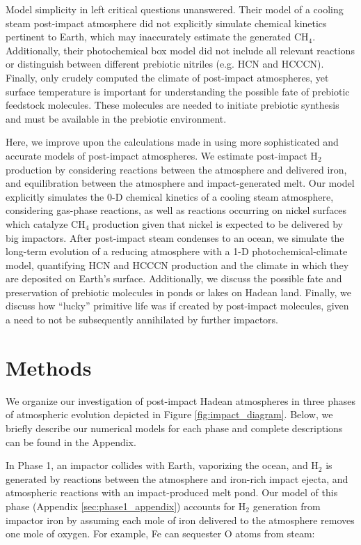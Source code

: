 Model simplicity in \citet{Zahnle_2020} left critical questions unanswered. Their model of a cooling steam post-impact atmosphere did not explicitly simulate chemical kinetics pertinent to Earth, which may inaccurately estimate the generated CH$_4$. Additionally, their photochemical box model did not include all relevant reactions or distinguish between different prebiotic nitriles (e.g. HCN and HCCCN). Finally, \citet{Zahnle_2020} only crudely computed the climate of post-impact atmospheres, yet surface temperature is important for understanding the possible fate of prebiotic feedstock molecules. These molecules are needed to initiate prebiotic synthesis and must be available in the prebiotic environment.

Here, we improve upon the calculations made in \citet{Zahnle_2020} using more sophisticated and accurate models of post-impact atmospheres. We estimate post-impact H$_2$ production by considering reactions between the atmosphere and delivered iron, and equilibration between the atmosphere and impact-generated melt. Our model explicitly simulates the 0-D chemical kinetics of a cooling steam atmosphere, considering gas-phase reactions, as well as reactions occurring on nickel surfaces which catalyze CH$_4$ production given that nickel is expected to be delivered by big impactors. After post-impact steam condenses to an ocean, we simulate the long-term evolution of a reducing atmosphere with a 1-D photochemical-climate model, quantifying HCN and HCCCN production and the climate in which they are deposited on Earth's surface. Additionally, we discuss the possible fate and preservation of prebiotic molecules in ponds or lakes on Hadean land. Finally, we discuss how ``lucky'' primitive life was if created by post-impact molecules, given a need to not be subsequently annihilated by further impactors.

\section{Methods}

We organize our investigation of post-impact Hadean atmospheres in three phases of atmospheric evolution depicted in Figure \ref{fig:impact_diagram}. Below, we briefly describe our numerical models for each phase and complete descriptions can be found in the Appendix.

In Phase 1, an impactor collides with Earth, vaporizing the ocean, and H$_2$ is generated by reactions between the atmosphere and iron-rich impact ejecta, and atmospheric reactions with an impact-produced melt pond. Our model of this phase (Appendix \ref{sec:phase1_appendix}) accounts for H$_2$ generation from impactor iron by assuming each mole of iron delivered to the atmosphere removes one mole of oxygen. For example, Fe can sequester O atoms from steam:

